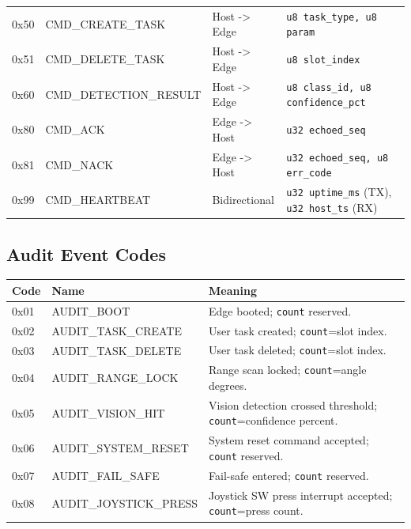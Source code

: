 \documentclass[11pt, a4paper]{article}
\begin{document}
\begin{longtable}{|l|l|l|l|}
0x50 & CMD\_CREATE\_TASK      & Host -> Edge & \texttt{u8 task\_type, u8 param} \\
0x51 & CMD\_DELETE\_TASK      & Host -> Edge & \texttt{u8 slot\_index} \\
0x60 & CMD\_DETECTION\_RESULT & Host -> Edge & \texttt{u8 class\_id, u8 confidence\_pct} \\
0x80 & CMD\_ACK               & Edge -> Host & \texttt{u32 echoed\_seq} \\
0x81 & CMD\_NACK              & Edge -> Host & \texttt{u32 echoed\_seq, u8 err\_code} \\
0x99 & CMD\_HEARTBEAT         & Bidirectional & \texttt{u32 uptime\_ms} (TX), \texttt{u32 host\_ts} (RX) \\
\hline
\end{longtable}

\subsection{Audit Event Codes}
\begin{tabularx}{\textwidth}{|l|l|X|}
\hline
\textbf{Code} & \textbf{Name} & \textbf{Meaning} \\
\hline
0x01 & AUDIT\_BOOT        & Edge booted; \texttt{count} reserved. \\
0x02 & AUDIT\_TASK\_CREATE & User task created; \texttt{count}=slot index. \\
0x03 & AUDIT\_TASK\_DELETE & User task deleted; \texttt{count}=slot index. \\
0x04 & AUDIT\_RANGE\_LOCK  & Range scan locked; \texttt{count}=angle degrees. \\
0x05 & AUDIT\_VISION\_HIT  & Vision detection crossed threshold; \texttt{count}=confidence percent. \\
0x06 & AUDIT\_SYSTEM\_RESET & System reset command accepted; \texttt{count} reserved. \\
0x07 & AUDIT\_FAIL\_SAFE   & Fail-safe entered; \texttt{count} reserved. \\
0x08 & AUDIT\_JOYSTICK\_PRESS & Joystick SW press interrupt accepted; \texttt{count}=press count. \\
\hline
\end{tabularx}
\end{document}
